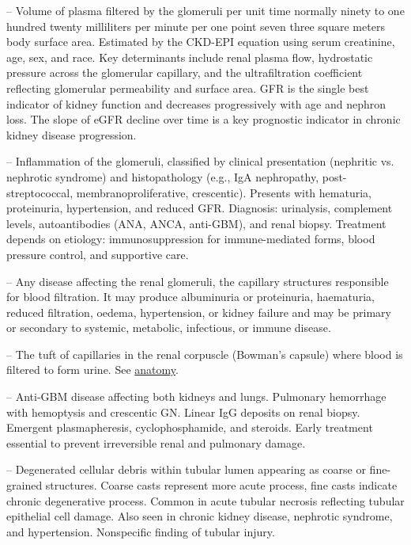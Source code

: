 -- Volume of plasma filtered by the glomeruli per unit time normally ninety to one hundred twenty milliliters per minute per one point seven three square meters body surface area. Estimated by the CKD-EPI equation using serum creatinine, age, sex, and race. Key determinants include renal plasma flow, hydrostatic pressure across the glomerular capillary, and the ultrafiltration coefficient reflecting glomerular permeability and surface area. GFR is the single best indicator of kidney function and decreases progressively with age and nephron loss. The slope of eGFR decline over time is a key prognostic indicator in chronic kidney disease progression.

-- Inflammation of the glomeruli, classified by clinical presentation (nephritic vs. nephrotic syndrome) and histopathology (e.g., IgA nephropathy, post-streptococcal, membranoproliferative, crescentic). Presents with hematuria, proteinuria, hypertension, and reduced GFR. Diagnosis: urinalysis, complement levels, autoantibodies (ANA, ANCA, anti-GBM), and renal biopsy. Treatment depends on etiology: immunosuppression for immune-mediated forms, blood pressure control, and supportive care.

-- Any disease affecting the renal glomeruli, the capillary structures responsible for blood filtration. It may produce albuminuria or proteinuria, haematuria, reduced filtration, oedema, hypertension, or kidney failure and may be primary or secondary to systemic, metabolic, infectious, or immune disease.

-- The tuft of capillaries in the renal corpuscle (Bowman's capsule) where blood is filtered to form urine. See \hyperlink{Anatomy}{anatomy}.

-- Anti-GBM disease affecting both kidneys and lungs. Pulmonary hemorrhage with hemoptysis and crescentic GN. Linear IgG deposits on renal biopsy. Emergent plasmapheresis, cyclophosphamide, and steroids. Early treatment essential to prevent irreversible renal and pulmonary damage.

-- Degenerated cellular debris within tubular lumen appearing as coarse or fine-grained structures. Coarse casts represent more acute process, fine casts indicate chronic degenerative process. Common in acute tubular necrosis reflecting tubular epithelial cell damage. Also seen in chronic kidney disease, nephrotic syndrome, and hypertension. Nonspecific finding of tubular injury.

